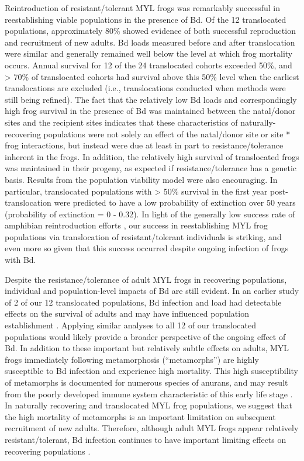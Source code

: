 \documentclass[9pt,twocolumn,twoside,lineno]{pnas-new}
\begin{document}
Reintroduction of resistant/tolerant MYL frogs was remarkably successful
in reestablishing viable populations in the presence of Bd. Of the 12
translocated populations, approximately 80\% showed evidence of both
successful reproduction and recruitment of new adults. Bd loads measured
before and after translocation were similar and generally remained well
below the level at which frog mortality occurs. Annual survival for 12
of the 24 translocated cohorts exceeded 50\%, and \textgreater{} 70\% of
translocated cohorts had survival above this 50\% level when the
earliest translocations are excluded (i.e., translocations conducted
when methods were still being refined). The fact that the relatively low
Bd loads and correspondingly high frog survival in the presence of Bd
was maintained between the natal/donor sites and the recipient sites
indicates that these characteristics of naturally-recovering populations
were not solely an effect of the natal/donor site or site * frog
interactions, but instead were due at least in part to
resistance/tolerance inherent in the frogs. In addition, the relatively
high survival of translocated frogs was maintained in their progeny, as
expected if resistance/tolerance has a genetic basis. Results from the
population viability model were also encouraging. In particular,
translocated populations with \textgreater{} 50\% survival in the first
year post-translocation were predicted to have a low probability of
extinction over 50 years (probability of extinction = 0 - 0.32). In
light of the generally low success rate of amphibian reintroduction
efforts \citep{dodd2005}, our success in reestablishing MYL frog
populations via translocation of resistant/tolerant individuals is
striking, and even more so given that this success occurred despite
ongoing infection of frogs with Bd.

Despite the resistance/tolerance of adult MYL frogs in recovering
populations, individual and population-level impacts of Bd are still
evident. In an earlier study of 2 of our 12 translocated populations, Bd
infection and load had detectable effects on the survival of adults and
may have influenced population establishment \citep[sites referred to as
``Alpine'' and ``Subalpine'' are referenced as ``70550'' and ``70505''
in the current study]{joseph2018}. Applying similar analyses to all 12
of our translocated populations would likely provide a broader
perspective of the ongoing effect of Bd. In addition to these important
but relatively subtle effects on adults, MYL frogs immediately following
metamorphosis (``metamorphs'') are highly susceptible to Bd infection
\citep{ellison2018} and experience high mortality. This high
susceptibility of metamorphs is documented for numerous species of
anurans, and may result from the poorly developed immune system
characteristic of this early life stage \citep{humphries2022}. In
naturally recovering and translocated MYL frog populations, we suggest
that the high mortality of metamorphs is an important limitation on
subsequent recruitment of new adults. Therefore, although adult MYL
frogs appear relatively resistant/tolerant, Bd infection continues to
have important limiting effects on recovering populations \citep[see
also][]{hollanders2022}.
\end{document}
